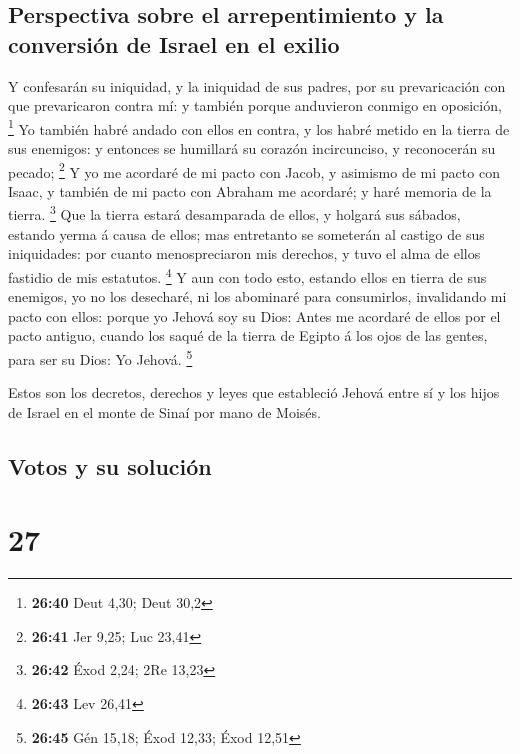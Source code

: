 \hypertarget{perspectiva-sobre-el-arrepentimiento-y-la-conversiuxf3n-de-israel-en-el-exilio}{%
\subsection{Perspectiva sobre el arrepentimiento y la conversión de
Israel en el
exilio}\label{perspectiva-sobre-el-arrepentimiento-y-la-conversiuxf3n-de-israel-en-el-exilio}}

 Y confesarán su iniquidad, y la iniquidad de sus padres,
por su prevaricación con que prevaricaron contra mí: y también porque
anduvieron conmigo en oposición, \footnote{\textbf{26:40} Deut 4,30;
  Deut 30,2}  Yo también habré andado con ellos en
contra, y los habré metido en la tierra de sus enemigos: y entonces se
humillará su corazón incircunciso, y reconocerán su pecado; \footnote{\textbf{26:41}
  Jer 9,25; Luc 23,41}  Y yo me acordaré de mi pacto con
Jacob, y asimismo de mi pacto con Isaac, y también de mi pacto con
Abraham me acordaré; y haré memoria de la tierra. \footnote{\textbf{26:42}
  Éxod 2,24; 2Re 13,23}  Que la tierra estará desamparada
de ellos, y holgará sus sábados, estando yerma á causa de ellos; mas
entretanto se someterán al castigo de sus iniquidades: por cuanto
menospreciaron mis derechos, y tuvo el alma de ellos fastidio de mis
estatutos. \footnote{\textbf{26:43} Lev 26,41}  Y aun con
todo esto, estando ellos en tierra de sus enemigos, yo no los desecharé,
ni los abominaré para consumirlos, invalidando mi pacto con ellos:
porque yo Jehová soy su Dios:  Antes me acordaré de ellos
por el pacto antiguo, cuando los saqué de la tierra de Egipto á los ojos
de las gentes, para ser su Dios: Yo Jehová. \footnote{\textbf{26:45} Gén
  15,18; Éxod 12,33; Éxod 12,51}

 Estos son los decretos, derechos y leyes que estableció
Jehová entre sí y los hijos de Israel en el monte de Sinaí por mano de
Moisés.

\hypertarget{votos-y-su-soluciuxf3n}{%
\subsection{Votos y su solución}\label{votos-y-su-soluciuxf3n}}

\hypertarget{section-26}{%
\section{27}\label{section-26}}

